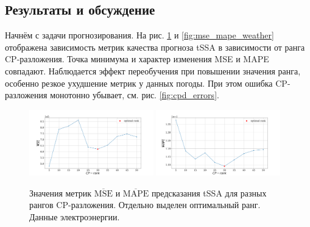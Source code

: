 		\subsection*{Результаты и обсуждение}
		
			Начнём с задачи прогнозирования. На рис. \ref{fig:mse_mape_electr} и \ref{fig:mse_mape_weather} отображена зависимость метрик качества прогноза tSSA в зависимости от ранга CP-разложения. Точка минимума и характер изменения MSE и MAPE совпадают. Наблюдается эффект переобучения при повышении значения ранга, особенно резкое ухудшение метрик у данных погоды. При этом ошибка CP-разложения монотонно убывает, см. рис. \ref{fig:cpd_errors}.
			
			\begin{figure}[h]
				\centering
				\includegraphics[width=0.48\textwidth, keepaspectratio]{../experiments/electricity/tssa/figs/prediction/MSE_rank.png}
				\includegraphics[width=0.48\textwidth, keepaspectratio]{../experiments/electricity/tssa/figs/prediction/MAPE_rank.png}
				\caption{Значения метрик $ \overline{\text{MSE}} $ и $ \overline{\text{MAPE}} $ предсказания tSSA для разных рангов CP-разложения. Отдельно выделен оптимальный ранг. Данные электроэнергии.}\label{fig:mse_mape_electr}
			\end{figure}
			
